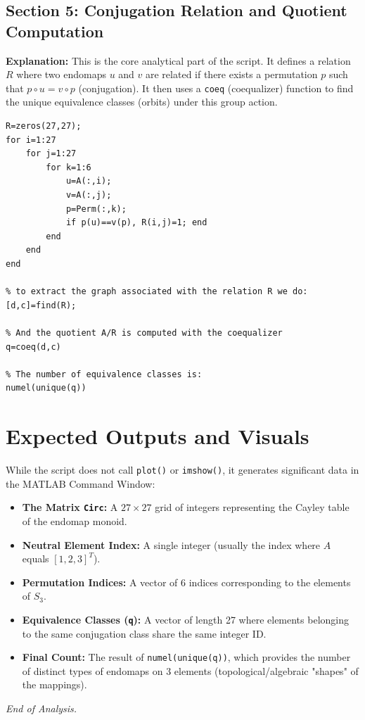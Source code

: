 \subsection{Section 5: Conjugation Relation and Quotient Computation}
\textbf{Explanation:} This is the core analytical part of the script. It defines a relation $R$ where two endomaps $u$ and $v$ are related if there exists a permutation $p$ such that $p \circ u = v \circ p$ (conjugation). It then uses a \texttt{coeq} (coequalizer) function to find the unique equivalence classes (orbits) under this group action.
\begin{lstlisting}
R=zeros(27,27);
for i=1:27
    for j=1:27
        for k=1:6
            u=A(:,i);
            v=A(:,j);
            p=Perm(:,k);
            if p(u)==v(p), R(i,j)=1; end
        end
    end
end

% to extract the graph associated with the relation R we do:
[d,c]=find(R);

% And the quotient A/R is computed with the coequalizer
q=coeq(d,c)

% The number of equivalence classes is:
numel(unique(q))
\end{lstlisting}

\section{Expected Outputs and Visuals}
While the script does not call \texttt{plot()} or \texttt{imshow()}, it generates significant data in the MATLAB Command Window:

\begin{itemize}
    \item \textbf{The Matrix \texttt{Circ}:} A $27 \times 27$ grid of integers representing the Cayley table of the endomap monoid.
    \item \textbf{Neutral Element Index:} A single integer (usually the index where $A$ equals $[1, 2, 3]^T$).
    \item \textbf{Permutation Indices:} A vector of 6 indices corresponding to the elements of $S_3$.
    \item \textbf{Equivalence Classes (\texttt{q}):} A vector of length 27 where elements belonging to the same conjugation class share the same integer ID.
    \item \textbf{Final Count:} The result of \texttt{numel(unique(q))}, which provides the number of distinct types of endomaps on 3 elements (topological/algebraic "shapes" of the mappings).
\end{itemize}

\vspace{1cm}
\begin{center}
    \textit{End of Analysis.}
\end{center}


